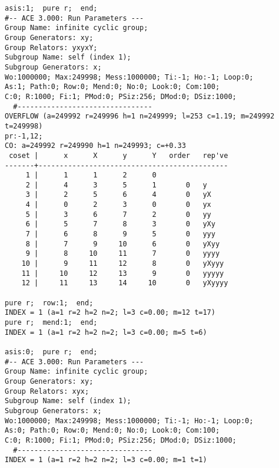 \bv\begin{verbatim}
asis:1;  pure r;  end;  
#-- ACE 3.000: Run Parameters ---
Group Name: infinite cyclic group;
Group Generators: xy;
Group Relators: yxyxY;
Subgroup Name: self (index 1);
Subgroup Generators: x;
Wo:1000000; Max:249998; Mess:1000000; Ti:-1; Ho:-1; Loop:0;
As:1; Path:0; Row:0; Mend:0; No:0; Look:0; Com:100;
C:0; R:1000; Fi:1; PMod:0; PSiz:256; DMod:0; DSiz:1000;
  #--------------------------------
OVERFLOW (a=249992 r=249996 h=1 n=249999; l=253 c=1.19; m=249992 t=249998)
pr:-1,12;
CO: a=249992 r=249990 h=1 n=249993; c=+0.33
 coset |      x      X      y      Y   order   rep've
-------+---------------------------------------------
     1 |      1      1      2      0
     2 |      4      3      5      1       0   y
     3 |      2      5      6      4       0   yX
     4 |      0      2      3      0       0   yx
     5 |      3      6      7      2       0   yy
     6 |      5      7      8      3       0   yXy
     7 |      6      8      9      5       0   yyy
     8 |      7      9     10      6       0   yXyy
     9 |      8     10     11      7       0   yyyy
    10 |      9     11     12      8       0   yXyyy
    11 |     10     12     13      9       0   yyyyy
    12 |     11     13     14     10       0   yXyyyy

pure r;  row:1;  end;
INDEX = 1 (a=1 r=2 h=2 n=2; l=3 c=0.00; m=12 t=17)
pure r;  mend:1;  end;
INDEX = 1 (a=1 r=2 h=2 n=2; l=3 c=0.00; m=5 t=6)

asis:0;  pure r;  end;  
#-- ACE 3.000: Run Parameters ---
Group Name: infinite cyclic group;
Group Generators: xy;
Group Relators: xyx;
Subgroup Name: self (index 1);
Subgroup Generators: x;
Wo:1000000; Max:249998; Mess:1000000; Ti:-1; Ho:-1; Loop:0;
As:0; Path:0; Row:0; Mend:0; No:0; Look:0; Com:100;
C:0; R:1000; Fi:1; PMod:0; PSiz:256; DMod:0; DSiz:1000;
  #--------------------------------
INDEX = 1 (a=1 r=2 h=2 n=2; l=3 c=0.00; m=1 t=1)


\end{verbatim}
